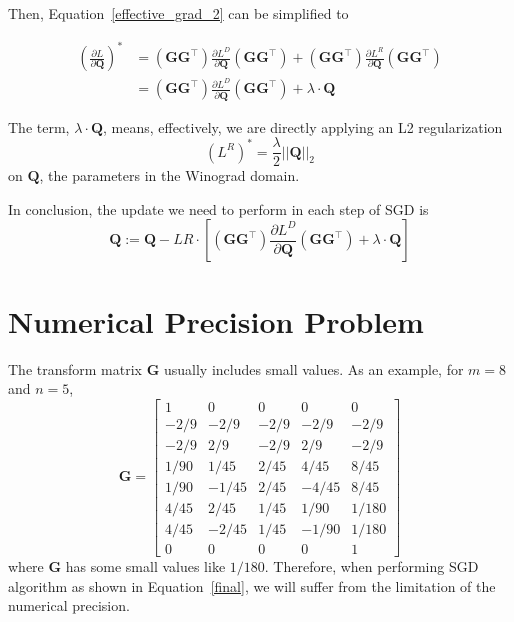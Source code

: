 \documentclass[12pt]{article} %
\begin{document}
Then, Equation~\ref{effective_grad_2} can be simplified to

\begin{equation}
\begin{aligned}
	(\frac{\partial L}{\partial \boldsymbol{Q}})^*
		&= (\boldsymbol{G} \boldsymbol{G}^{\top})\frac{\partial L^D}{\partial \boldsymbol{Q}}(\boldsymbol{G} \boldsymbol{G}^{\top}) + 
		(\boldsymbol{G} \boldsymbol{G}^{\top})\frac{\partial L^R}{\partial \boldsymbol{Q}}(\boldsymbol{G} \boldsymbol{G}^{\top}) \\
		&= (\boldsymbol{G} \boldsymbol{G}^{\top})\frac{\partial L^D}{\partial \boldsymbol{Q}}(\boldsymbol{G} \boldsymbol{G}^{\top}) +
		\lambda \cdot \boldsymbol{Q}
\end{aligned}
\end{equation}

The term, $\lambda \cdot \boldsymbol{Q}$, means, effectively, we are directly applying an L2 regularization
\begin{equation}
	(L^R)^* = \frac{\lambda}{2}{||\boldsymbol{Q}||}_2
\end{equation}
on $\boldsymbol{Q}$, the parameters in the Winograd domain.

In conclusion, the update we need to perform in each step of SGD is
\begin{equation}
\label{final}
	\boldsymbol{Q} := \boldsymbol{Q}
	- LR \cdot [(\boldsymbol{G} \boldsymbol{G}^{\top})\frac{\partial L^D}{\partial \boldsymbol{Q}}(\boldsymbol{G} \boldsymbol{G}^{\top})
	+ \lambda \cdot \boldsymbol{Q}]
\end{equation}

\iffalse

\section{Numerical Precision Problem}

The transform matrix $\boldsymbol{G}$ usually includes small values. As an example, for $m = 8$ and $n = 5$,
\begin{equation}
\boldsymbol{G}=\left [ \begin{matrix}
 1   &   0   &  0   &   0   &   0   \\                              
-2/9 & -2/9  & -2/9 & -2/9  & -2/9  \\
-2/9 &  2/9  & -2/9 &  2/9  & -2/9  \\
1/90 & 1/45  & 2/45 & 4/45  & 8/45  \\
1/90 & -1/45 & 2/45 & -4/45 & 8/45  \\
4/45 & 2/45  & 1/45 & 1/90  & 1/180 \\
4/45 & -2/45 & 1/45 & -1/90 & 1/180 \\
 0   &   0   &   0  &    0  &    1  
\end{matrix} \right ]
\end{equation}
where $\boldsymbol{G}$ has some small values like $1/180$. Therefore, when performing SGD algorithm as shown in Equation~\ref{final}, we will suffer from the limitation of the numerical precision.
\end{document}
